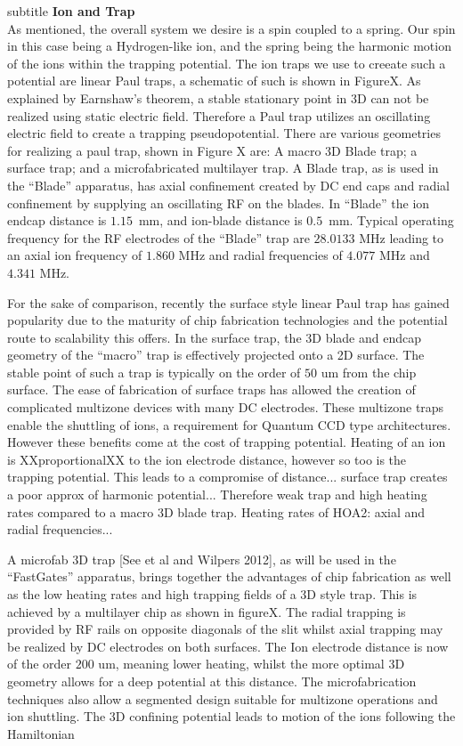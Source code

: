 \documentclass{article}
\begin{document}
subtitle \textbf{Ion and Trap}\\

As mentioned, the overall system we desire is a spin coupled to a
spring. Our spin in this case being a Hydrogen-like ion, and the
spring being the harmonic motion of the ions within the trapping
potential. The ion traps we use to creeate such a potential are linear
Paul traps, a schematic of such is shown in FigureX. As explained by
Earnshaw's theorem, a stable stationary point in 3D can not be
realized using static electric field. Therefore a Paul trap utilizes
an oscillating electric field to create a trapping
pseudopotential. There are various geometries for realizing a paul
trap, shown in Figure X are: A macro 3D Blade trap; a surface trap;
and a microfabricated multilayer trap.  A Blade trap, as is used in
the ``Blade'' apparatus, has axial confinement created by DC end caps
and radial confinement by supplying an oscillating RF on the blades.
In ``Blade'' the ion endcap distance is $1.15$~mm, and ion-blade
distance is $0.5$~mm. Typical operating frequency for the RF
electrodes of the ``Blade'' trap are $28.0133$ MHz leading to an axial
ion frequency of $1.860$ MHz and radial frequencies of $4.077$ MHz and
$4.341$ MHz.

For the sake of comparison, recently the surface style linear Paul
trap has gained popularity due to the maturity of chip fabrication
technologies and the potential route to scalability this offers. In
the surface trap, the 3D blade and endcap geometry of the ``macro''
trap is effectively projected onto a 2D surface. The stable point of
such a trap is typically on the order of $50$ um from the chip
surface. The ease of fabrication of surface traps has allowed the
creation of complicated multizone devices with many DC electrodes.
These multizone traps enable the shuttling of ions, a requirement for
Quantum CCD type architectures. However these benefits come at the
cost of trapping potential. Heating of an ion is XXproportionalXX to
the ion electrode distance, however so too is the trapping
potential. This leads to a compromise of distance... surface trap
creates a poor approx of harmonic potential... Therefore weak trap and
high heating rates compared to a macro 3D blade trap. Heating rates of
HOA2: axial and radial frequencies...

A microfab 3D trap [See et al and Wilpers 2012], as will be used in
the ``FastGates'' apparatus, brings together the advantages of chip
fabrication as well as the low heating rates and high trapping fields
of a 3D style trap. This is achieved by a multilayer chip as shown in
figureX. The radial trapping is provided by RF rails on opposite
diagonals of the slit whilst axial trapping may be realized by DC
electrodes on both surfaces. The Ion electrode distance is now of the
order $200$ um, meaning lower heating, whilst the more optimal 3D
geometry allows for a deep potential at this distance. The
microfabrication techniques also allow a segmented design suitable for
multizone operations and ion shuttling.  The 3D confining potential
leads to motion of the ions following the Hamiltonian
\end{document}
